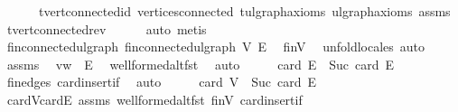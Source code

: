 \begin{isabellebody}
\ \ \ \ \ \ t{\isacharprime}{\kern0pt}{\isachardot}{\kern0pt}vert{\isacharunderscore}{\kern0pt}connected{\isacharunderscore}{\kern0pt}id\ vertices{\isacharunderscore}{\kern0pt}connected\ t{\isacharprime}{\kern0pt}{\isachardot}{\kern0pt}ulgraph{\isacharunderscore}{\kern0pt}axioms\ ulgraph{\isacharunderscore}{\kern0pt}axioms\ assms\ t{\isacharprime}{\kern0pt}{\isachardot}{\kern0pt}vert{\isacharunderscore}{\kern0pt}connected{\isacharunderscore}{\kern0pt}rev\isanewline
\ \ \ \ \isamarkupfalse%
\ {\isacharparenleft}{\kern0pt}auto{\isacharcomma}{\kern0pt}\ metis{\isacharplus}{\kern0pt}{\isacharparenright}{\kern0pt}\isanewline
\isanewline
\ \ \isamarkupfalse%
\ \isamarkupfalse%
\ fin{\isacharunderscore}{\kern0pt}connected{\isacharunderscore}{\kern0pt}ulgraph{\isacharcolon}{\kern0pt}\ {\isachardoublequoteopen}fin{\isacharunderscore}{\kern0pt}connected{\isacharunderscore}{\kern0pt}ulgraph\ {\isacharquery}{\kern0pt}V{\isacharprime}{\kern0pt}\ {\isacharquery}{\kern0pt}E{\isacharprime}{\kern0pt}{\isachardoublequoteclose}\ \isamarkupfalse%
\ finV\ \isamarkupfalse%
\ {\isacharparenleft}{\kern0pt}unfold{\isacharunderscore}{\kern0pt}locales{\isacharcomma}{\kern0pt}\ auto{\isacharparenright}{\kern0pt}\isanewline
\isanewline
\ \ \isamarkupfalse%
\ assms\ \isamarkupfalse%
\ {\isachardoublequoteopen}{\isacharbraceleft}{\kern0pt}v{\isacharcomma}{\kern0pt}w{\isacharbraceright}{\kern0pt}\ {\isasymnotin}\ E{\isachardoublequoteclose}\ \isamarkupfalse%
\ wellformed{\isacharunderscore}{\kern0pt}alt{\isacharunderscore}{\kern0pt}fst\ \isamarkupfalse%
\ auto\isanewline
\ \ \isamarkupfalse%
\ \isamarkupfalse%
\ {\isachardoublequoteopen}card\ {\isacharquery}{\kern0pt}E{\isacharprime}{\kern0pt}\ {\isacharequal}{\kern0pt}\ Suc\ {\isacharparenleft}{\kern0pt}card\ E{\isacharparenright}{\kern0pt}{\isachardoublequoteclose}\ \isamarkupfalse%
\ fin{\isacharunderscore}{\kern0pt}edges\ card{\isacharunderscore}{\kern0pt}insert{\isacharunderscore}{\kern0pt}if\ \isamarkupfalse%
\ auto\isanewline
\ \ \isamarkupfalse%
\ \isamarkupfalse%
\ {\isachardoublequoteopen}card\ {\isacharquery}{\kern0pt}V{\isacharprime}{\kern0pt}\ {\isacharequal}{\kern0pt}\ Suc\ {\isacharparenleft}{\kern0pt}card\ {\isacharquery}{\kern0pt}E{\isacharprime}{\kern0pt}{\isacharparenright}{\kern0pt}{\isachardoublequoteclose}\ \isamarkupfalse%
\ card{\isacharunderscore}{\kern0pt}V{\isacharunderscore}{\kern0pt}card{\isacharunderscore}{\kern0pt}E\ assms\ wellformed{\isacharunderscore}{\kern0pt}alt{\isacharunderscore}{\kern0pt}fst\ finV\ card{\isacharunderscore}{\kern0pt}insert{\isacharunderscore}{\kern0pt}if\ \isamarkupfalse%

\end{isabellebody}
